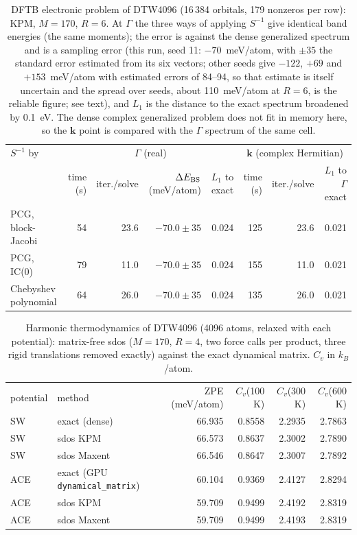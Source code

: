 \begin{table}[t]\caption{DFTB electronic problem of DTW4096 (16\,384 orbitals, 179 nonzeros per row): KPM, $M=170$, $R=6$. At $\Gamma$ the three ways of applying $S^{-1}$ give identical band energies (the same moments); the error is against the dense generalized spectrum and is a sampling error (this run, seed 11: $-70$~meV/atom, with $\pm35$ the standard error estimated from its six vectors; other seeds give $-122$, $+69$ and $+153$~meV/atom with estimated errors of 84--94, so that estimate is itself uncertain and the spread over seeds, about 110~meV/atom at $R=6$, is the reliable figure; see text), and $L_1$ is the distance to the exact spectrum broadened by 0.1~eV. The dense complex generalized problem does not fit in memory here, so the $\mathbf k$ point is compared with the $\Gamma$ spectrum of the same cell.}\label{tab:dd}\begin{ruledtabular}\begin{tabular}{lrrrrrrr}
$S^{-1}$ by & \multicolumn{4}{c}{$\Gamma$ (real)} & \multicolumn{3}{c}{$\mathbf k$ (complex Hermitian)} \\ & time (s) & iter./solve & $\Delta E_{\rm BS}$ (meV/atom) & $L_1$ to exact & time (s) & iter./solve & $L_1$ to $\Gamma$ exact \\ \colrule
PCG, block-Jacobi & 54 & 23.6 & $-70.0\pm35$ & 0.024 & 125 & 23.6 & 0.021 \\
PCG, IC(0) & 79 & 11.0 & $-70.0\pm35$ & 0.024 & 155 & 11.0 & 0.021 \\
Chebyshev polynomial & 64 & 26.0 & $-70.0\pm35$ & 0.024 & 135 & 26.0 & 0.021 \\
\end{tabular}\end{ruledtabular}\end{table}

\begin{table}[t]\caption{Harmonic thermodynamics of DTW4096 (4096 atoms, relaxed with each potential): matrix-free sdos ($M=170$, $R=4$, two force calls per product, three rigid translations removed exactly) against the exact dynamical matrix. $C_v$ in $k_B$/atom.}\label{tab:ph}\begin{ruledtabular}\begin{tabular}{llrrrr}
potential & method & ZPE (meV/atom) & $C_v$(100 K) & $C_v$(300 K) & $C_v$(600 K) \\ \colrule
SW & exact (dense) & 66.935 & 0.8558 & 2.2935 & 2.7863 \\
SW & sdos KPM & 66.573 & 0.8637 & 2.3002 & 2.7890 \\
SW & sdos Maxent & 66.546 & 0.8647 & 2.3007 & 2.7892 \\
\colrule
ACE & exact (GPU \texttt{dynamical\_matrix}) & 60.104 & 0.9369 & 2.4127 & 2.8294 \\
ACE & sdos KPM & 59.709 & 0.9499 & 2.4192 & 2.8319 \\
ACE & sdos Maxent & 59.709 & 0.9499 & 2.4193 & 2.8319 \\
\end{tabular}\end{ruledtabular}\end{table}

